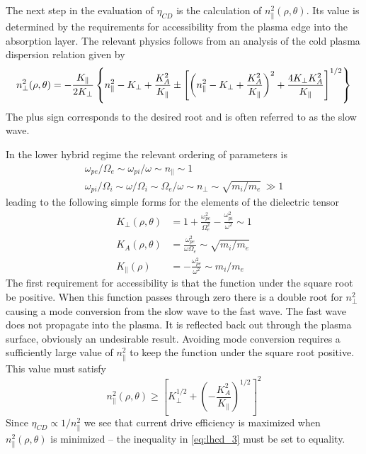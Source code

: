 The next step in the evaluation of $\eta_{CD}$ is the calculation of $n_\parallel^2(\rho,\theta)$. Its value is determined by the requirements for accessibility from the plasma edge into the absorption layer. The relevant physics follows from an analysis of the cold plasma dispersion relation given by 
\begin{equation}
\small
\label{eq:lhcd_4}
n _ { \perp } ^ { 2 } ( \rho , \theta ) = - \frac { K _ { \| } } { 2 K _ { \perp } } \left\{ n _ { \| } ^ { 2 } - K _ { \perp } + \frac { K _ { A } ^ { 2 } } { K _ { \| } } \pm \left[ \left( n _ { \| } ^ { 2 } - K _ { \perp } + \frac { K _ { A } ^ { 2 } } { K _ { \| } } \right) ^ { 2 } + \frac { 4 K _ { \perp } K _ { A } ^ { 2 } } { K _ { \| } } \right] ^ { 1 / 2 } \right\}
\end{equation}
The plus sign corresponds to the desired root and is often referred to as the slow wave.

In the lower hybrid regime the relevant ordering of parameters is
\begin{equation}
\begin{array} { c } { \omega _ { p e } / \Omega _ { e } \sim \omega _ { p i } / \omega \sim n _ { \| } \sim 1 } \\ { \omega _ { p i } / \Omega _ { i } \sim \omega / \Omega _ { i } \sim \Omega _ { e } / \omega \sim n _ { \perp } \sim \sqrt{ m _ { i } / m _ { e } }  \, \gg 1 } \end{array}
\end{equation}
leading to the following simple forms for the elements of the dielectric tensor
\begin{equation}
	\begin{aligned} K _ { \perp } ( \rho , \theta ) & = 1 + \frac { \omega _ { p e } ^ { 2 } } { \Omega _ { e } ^ { 2 } } - \frac { \omega _ { p i } ^ { 2 } } { \omega ^ { 2 } } \sim 1 \\ K _ { A } ( \rho , \theta ) & = \frac { \omega _ { p e } ^ { 2 } } { \omega \Omega _ { e } } \sim \sqrt{ m _ { i } / m _ { e } } \\ K _ { \| } ( \rho ) & = - \frac { \omega _ { p e } ^ { 2 } } { \omega ^ { 2 } } \sim m _ { i } / m _ { e } \end{aligned}
\end{equation}
The first requirement for accessibility is that the function under the square root be positive. When this function passes through zero there is a double root for $n_\perp^2$ causing a mode conversion from the slow wave to the fast wave. The fast wave does not propagate into the plasma. It is reflected back out through the plasma surface, obviously an undesirable result. Avoiding mode conversion requires a sufficiently large value of $n_\parallel^2$ to keep the function under the square root positive. This value must satisfy
\begin{equation}
	\label{eq:lhcd_3}
	n _ { \| } ^ { 2 } ( \rho , \theta ) \geq \left[ K _ { \perp } ^ { 1 / 2 } + \left( - \frac { K _ { A } ^ { 2 } } { K _ { \| } } \right) ^ { 1 / 2 } \right] ^ { 2 }
\end{equation}
Since $\eta_{CD} \propto 1 / n_\parallel^2$ we see that current drive efficiency is maximized when $n_\parallel^2(\rho,\theta)$ is minimized -- the inequality in \cref{eq:lhcd_3} must be set to equality.

